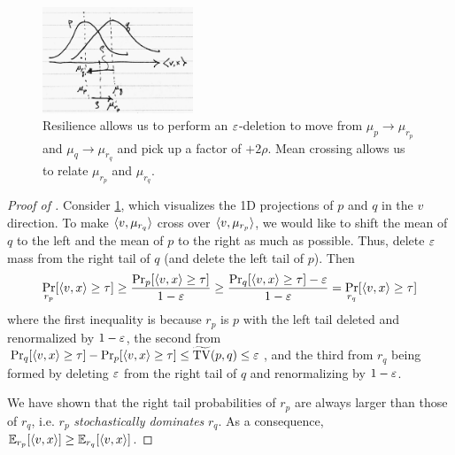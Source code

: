 \begin{figure}[H]
    \begin{center}
        \includegraphics[width=0.4\textwidth]{figures/9-12-1.png}
    \end{center}
    \caption{
        Resilience allows us to perform an $\varepsilon$-deletion to
        move from $\mu_p \to \mu_{r_p}$ and $\mu_q \to \mu_{r_q}$
        and pick up a factor of $+2 \rho$.
        Mean crossing allows us to relate $\mu_{r_p}$ and $\mu_{r_q}$.
    }
    \label{fig:resilience-mean-crossing}
\end{figure}

\begin{proof}[Proof of ]
    Consider \cref{fig:resilience-mean-crossing}, which visualizes the 1D
    projections of $p$ and $q$ in the $v$ direction.  To make $\braket{v,
    \mu_{r_q}}$ cross over $\braket{v, \mu_{r_p}}$, we would like to shift the
    mean of $q$ to the left and the mean of $p$ to the right as much as
    possible.  Thus, delete $\varepsilon$ mass from the right tail of $q$ (and delete
    the left tail of $p$). Then
    \begin{align}
        \Pr_{r_p}[\braket{v,x} \geq \tau]
        \geq \frac{\Pr_{p}[\braket{v,x} \geq \tau]}{1 - \varepsilon}
        \geq \frac{\Pr_{q}[\braket{v,x} \geq \tau] - \varepsilon}{1 - \varepsilon}
        = \Pr_{r_q}[\braket{v,x} \geq \tau]
    \end{align}
    where the first inequality is because $r_p$ is $p$ with the left
    tail deleted and renormalized by $1-\varepsilon$,
    the second from
    $\Pr_q[\braket{v,x} \geq \tau] - \Pr_p[\braket{v,x} \geq \tau] \leq \widetilde{\operatorname{TV}}(p,q) \leq \varepsilon$,
    and the third from $r_q$ being formed by deleting $\varepsilon$ from the right tail of
    $q$ and renormalizing by $1-\varepsilon$.

    We have shown that the right tail probabilities of $r_p$ are always larger
    than those of $r_q$, i.e. $r_p$ \emph{stochastically dominates} $r_q$.
    As a consequence, $\mathbb{E}_{r_p}[\braket{v,x}] \geq \mathbb{E}_{r_q}[\braket{v,x}]$.
\end{proof}

